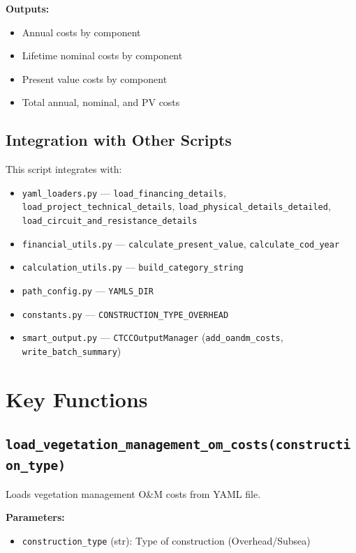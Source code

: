 \documentclass[ctcc_full_documentation.tex]{subfiles}
\begin{document}
\textbf{Outputs:}
\begin{itemize}
    \item Annual costs by component
    \item Lifetime nominal costs by component
    \item Present value costs by component
    \item Total annual, nominal, and PV costs
\end{itemize}

\subsection{Integration with Other Scripts}

This script integrates with:
\begin{itemize}
    \item \texttt{yaml\_loaders.py} --- \texttt{load\_financing\_details}, \texttt{load\_project\_technical\_details}, \texttt{load\_physical\_details\_detailed}, \texttt{load\_circuit\_and\_resistance\_details}
    \item \texttt{financial\_utils.py} --- \texttt{calculate\_present\_value}, \texttt{calculate\_cod\_year}
    \item \texttt{calculation\_utils.py} --- \texttt{build\_category\_string}
    \item \texttt{path\_config.py} --- \texttt{YAMLS\_DIR}
    \item \texttt{constants.py} --- \texttt{CONSTRUCTION\_TYPE\_OVERHEAD}
    \item \texttt{smart\_output.py} --- \texttt{CTCCOutputManager} (\texttt{add\_oandm\_costs}, \texttt{write\_batch\_summary})
\end{itemize}

\section{Key Functions}

\subsection{\texttt{load\_vegetation\_management\_om\_costs(construction\_type)}}

Loads vegetation management O\&M costs from YAML file.

\textbf{Parameters:}
\begin{itemize}
    \item \texttt{construction\_type} (str): Type of construction (Overhead/Subsea)
\end{itemize}
\end{document}
